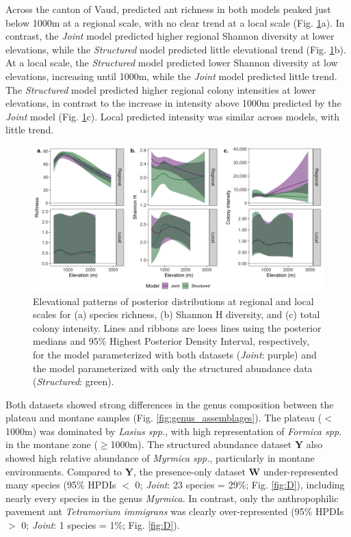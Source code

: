 \documentclass[preprint,review,times,12pt,3p]{elsarticle}
\begin{document}
Across the canton of Vaud, predicted ant richness in both models peaked just below 1000m at a regional scale, with no clear trend at a local scale (Fig. \ref{fig:el_patterns}a). In contrast, the \emph{Joint} model predicted higher regional Shannon diversity at lower elevations, while the \emph{Structured} model predicted little elevational trend (Fig. \ref{fig:el_patterns}b). At a local scale, the \emph{Structured} model predicted lower Shannon diversity at low elevations, increasing until 1000m, while the \emph{Joint} model predicted little trend. The \emph{Structured} model predicted higher regional colony intensities at lower elevations, in contrast to the increase in intensity above 1000m predicted by the \emph{Joint} model (Fig. \ref{fig:el_patterns}c). Local predicted intensity was similar across models, with little trend. 

\begin{figure}
	\centering\includegraphics[width=6in]{../../../ms/1_Ecography/1/figs/el_patterns.png}
	\caption{\label{fig:el_patterns} Elevational patterns of posterior distributions at regional and local scales for (a) species richness, (b) Shannon H diversity, and (c) total colony intensity. Lines and ribbons are loess lines using the posterior medians and 95\% Highest Posterior Density Interval, respectively, for the model parameterized with both datasets (\emph{Joint}: purple) and the model parameterized with only the structured abundance data (\emph{Structured}: green). }
\end{figure}

Both datasets showed strong differences in the genus composition between the plateau and montane samples (Fig. \ref{fig:genus_assemblages}). The plateau ($<$1000m) was dominated by \emph{Lasius spp.}, with high representation of \emph{Formica spp.} in the montane zone ($\geq$1000m). The structured abundance dataset \textbf{Y} also showed high relative abundance of \emph{Myrmica spp.}, particularly in montane environments. Compared to \textbf{Y}, the presence-only dataset \textbf{W} under-represented many species (95\% HPDIs $<$ 0; \emph{Joint}: 23 species = 29\%; Fig. \ref{fig:D}), including nearly every species in the genus \emph{Myrmica}. In contrast, only the anthropophilic pavement ant \emph{Tetramorium immigrans} was clearly over-represented (95\% HPDIs $>$ 0; \emph{Joint}: 1 species = 1\%; Fig. \ref{fig:D}). 
\end{document}
